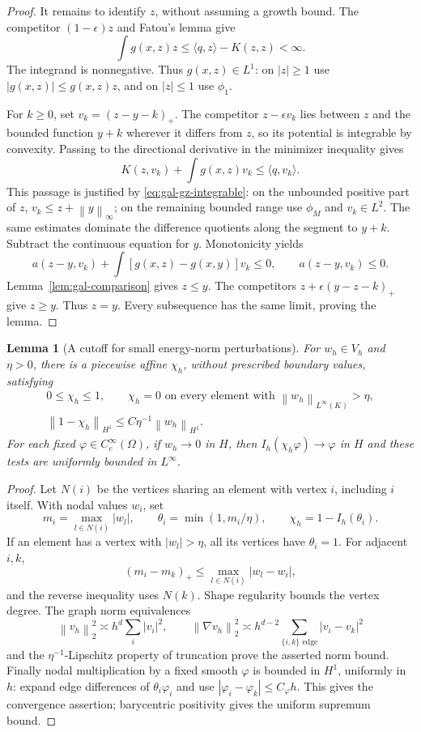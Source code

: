 \documentclass[11pt,a4paper]{article}
\newcommand{\norm}[1]{\left\lVert#1\right\rVert}
\newcommand{\abs}[1]{\left\lvert#1\right\rvert}
\newtheorem{lemma}[theorem]{Lemma}
\theoremstyle{definition}
\theoremstyle{remark}
\numberwithin{equation}{section}
\begin{document}
\begin{proof}
It remains to identify $z$, without assuming a growth bound. The competitor $(1-\epsilon)z$ and Fatou's lemma give
\begin{equation}\label{eq:gal-gz-integrable}
 \int g(x,z)z\le\langle q,z\rangle-K(z,z)<\infty.
\end{equation}
The integrand is nonnegative. Thus $g(x,z)\in L^1$: on $\abs z\ge1$ use $\abs{g(x,z)}\le g(x,z)z$, and on $\abs z\le1$ use $\phi_1$.

For $k\ge0$, set $v_k=(z-y-k)_+$. The competitor $z-\epsilon v_k$ lies between $z$ and the bounded function $y+k$ wherever it differs from $z$, so its potential is integrable by convexity. Passing to the directional derivative in the minimizer inequality gives
\[
 K(z,v_k)+\int g(x,z)v_k\le\langle q,v_k\rangle.
\]
This passage is justified by \eqref{eq:gal-gz-integrable}: on the unbounded positive part of $z$, $v_k\le z+\norm y_\infty$; on the remaining bounded range use $\phi_M$ and $v_k\in L^2$. The same estimates dominate the difference quotients along the segment to $y+k$.
Subtract the continuous equation for $y$. Monotonicity yields
\[
 a(z-y,v_k)+\int[g(x,z)-g(x,y)]v_k\le0,
 \qquad a(z-y,v_k)\le0.
\]
Lemma~\ref{lem:gal-comparison} gives $z\le y$. The competitors $z+\epsilon(y-z-k)_+$ give $z\ge y$. Thus $z=y$. Every subsequence has the same limit, proving the lemma.
\end{proof}

\begin{lemma}[A cutoff for small energy-norm perturbations]\label{lem:gal-small-cutoff}
For $w_h\in V_h$ and $\eta>0$, there is a piecewise affine $\chi_h$, without prescribed boundary values, satisfying
\[
\begin{gathered}
 0\le\chi_h\le1,\qquad
 \chi_h=0\text{ on every element with }\norm{w_h}_{L^\infty(K)}>\eta,\\
 \norm{1-\chi_h}_{H^1}\le C\eta^{-1}\norm{w_h}_{H^1}.
\end{gathered}
\]
For each fixed $\varphi\in C_c^\infty(\Omega)$, if $w_h\to0$ in $H$, then $I_h(\chi_h\varphi)\to\varphi$ in $H$ and these tests are uniformly bounded in $L^\infty$.
\end{lemma}
\begin{proof}
Let $N(i)$ be the vertices sharing an element with vertex $i$, including $i$ itself. With nodal values $w_i$, set
\[
 m_i=\max_{l\in N(i)}\abs{w_l},\qquad
 \theta_i=\min(1,m_i/\eta),\qquad
 \chi_h=1-I_h(\theta_i).
\]
If an element has a vertex with $\abs{w_l}>\eta$, all its vertices have $\theta_i=1$. For adjacent $i,k$,
\[
 (m_i-m_k)_+\le\max_{l\in N(i)}\abs{w_l-w_i},
\]
and the reverse inequality uses $N(k)$. Shape regularity bounds the vertex degree. The graph norm equivalences
\[
 \norm{v_h}_2^2\asymp h^d\sum_i\abs{v_i}^2,
 \qquad
 \norm{\nabla v_h}_2^2\asymp h^{d-2}
          \sum_{\{i,k\}\text{ edge}}\abs{v_i-v_k}^2
\]
and the $\eta^{-1}$-Lipschitz property of truncation prove the asserted norm bound. Finally nodal multiplication by a fixed smooth $\varphi$ is bounded in $H^1$, uniformly in $h$: expand edge differences of $\theta_i\varphi_i$ and use $\abs{\varphi_i-\varphi_k}\le C_\varphi h$. This gives the convergence assertion; barycentric positivity gives the uniform supremum bound.
\end{proof}
\end{document}
